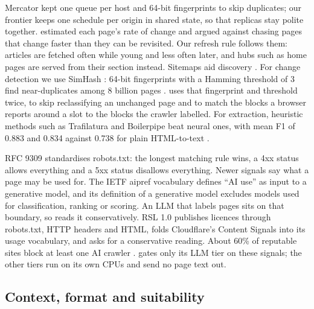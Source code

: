 Mercator \citep{heydon1999mercator} kept one queue per host and 64-bit fingerprints to skip duplicates; our frontier keeps one schedule per origin in shared state, so that replicas stay polite together. \citet{cho2003effective,cho2003estimating} estimated each page's rate of change and argued against chasing pages that change faster than they can be revisited. Our refresh rule follows them: articles are fetched often while young and less often later, and hubs such as home pages are served from their section instead. Sitemaps aid discovery \citep{schonfeld2009sitemaps}. For change detection we use SimHash \citep{charikar2002similarity}: 64-bit fingerprints with a Hamming threshold of 3 find near-duplicates among 8 billion pages \citep{manku2007detecting}. \sys{} uses that fingerprint and threshold twice, to skip reclassifying an unchanged page and to match the blocks a browser reports around a slot to the blocks the crawler labelled. For extraction, heuristic methods such as Trafilatura \citep{barbaresi2021trafilatura} and Boilerpipe \citep{kohlschutter2010boilerplate} beat neural ones, with mean F1 of 0.883 and 0.834 against 0.738 for plain HTML-to-text \citep{bevendorff2023empirical}.

RFC 9309 \citep{rfc9309} standardises robots.txt: the longest matching rule wins, a 4xx status allows everything and a 5xx status disallows everything. Newer signals say what a page may be used for. The IETF aipref vocabulary \citep{keller2026vocabulary} defines ``AI use'' as input to a generative model, and its definition of a generative model excludes models used for classification, ranking or scoring. An LLM that labels pages sits on that boundary, so \sys{} reads it conservatively. RSL 1.0 \citep{rsl2025really} publishes licences through robots.txt, HTTP headers and HTML, folds Cloudflare's Content Signals into its usage vocabulary, and asks for a conservative reading. About 60\% of reputable sites block at least one AI crawler \citep{steinackerolsztyn2026misinformation}. \sys{} gates only its LLM tier on these signals; the other tiers run on its own CPUs and send no page text out.

\subsection{Context, format and suitability}\label{sec:related-effect}

